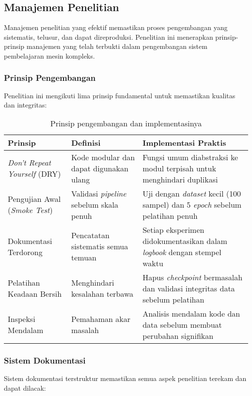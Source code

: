 \documentclass[12pt,a4paper]{article}
\begin{document}
\subsection{Manajemen Penelitian}
\label{subsec:manajemen-penelitian}

Manajemen penelitian yang efektif memastikan proses pengembangan yang sistematis, telusur, dan dapat direproduksi. Penelitian ini menerapkan prinsip-prinsip manajemen yang telah terbukti dalam pengembangan sistem pembelajaran mesin kompleks.

\subsubsection{Prinsip Pengembangan}
Penelitian ini mengikuti lima prinsip fundamental untuk memastikan kualitas dan integritas:

\begin{table}[H]
\centering
\caption{Prinsip pengembangan dan implementasinya}
\label{tab:development-principles}
\small
\begin{tabular}{|p{4cm}|p{5cm}|p{5cm}|}
\hline
\textbf{Prinsip} & \textbf{Definisi} & \textbf{Implementasi Praktis} \\ \hline
\textit{Don't Repeat Yourself} (DRY) & Kode modular dan dapat digunakan ulang & Fungsi umum diabstraksi ke modul terpisah untuk menghindari duplikasi \\ \hline
Pengujian Awal (\textit{Smoke Test}) & Validasi \textit{pipeline} sebelum skala penuh & Uji dengan \textit{dataset} kecil (100 sampel) dan 5 \textit{epoch} sebelum pelatihan penuh \\ \hline
Dokumentasi Terdorong & Pencatatan sistematis semua temuan & Setiap eksperimen didokumentasikan dalam \textit{logbook} dengan stempel waktu \\ \hline
Pelatihan Keadaan Bersih & Menghindari kesalahan terbawa & Hapus \textit{checkpoint} bermasalah dan validasi integritas data sebelum pelatihan \\ \hline
Inspeksi Mendalam & Pemahaman akar masalah & Analisis mendalam kode dan data sebelum membuat perubahan signifikan \\ \hline
\end{tabular}
\end{table}

\subsubsection{Sistem Dokumentasi}
Sistem dokumentasi terstruktur memastikan semua aspek penelitian terekam dan dapat dilacak:
\end{document}
